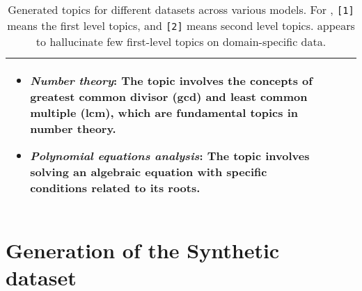 \begin{table*}[h!]
\begin{tabular}{p{}p{}p{}p{}}
\begin{itemize}[leftmargin=*,noitemsep,topsep=0pt]
    \item \textit{Number theory}: The topic involves the concepts of greatest common divisor (gcd) and least common multiple (lcm), which are fundamental topics in number theory.
    \item \textit{Polynomial equations analysis}: The topic involves solving an algebraic equation with specific conditions related to its roots.
\end{itemize} \\
\bottomrule
\end{tabular}
\caption{Generated topics for different datasets across various models. For \topicgpt{}, \texttt{[1]} means the first level topics, and \texttt{[2]} means second level topics. \topicgpt{} appears to hallucinate few first-level topics on domain-specific data.}
\label{tab:topic_generation_comparison}
\end{table*}



\section{Generation of the Synthetic dataset}\label{appendix:synthetic}
\onecolumn



